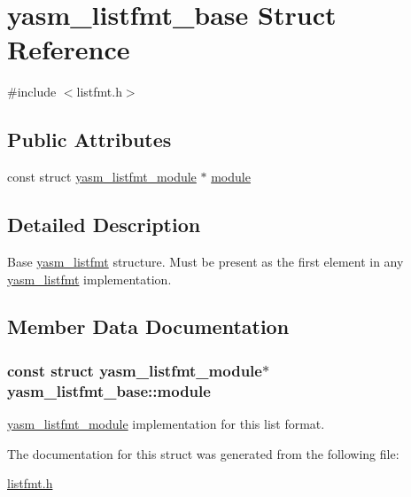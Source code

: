 \hypertarget{structyasm__listfmt__base}{\section{yasm\-\_\-listfmt\-\_\-base Struct Reference}
\label{structyasm__listfmt__base}
}


{\ttfamily \#include $<$listfmt.\-h$>$}

\subsection*{Public Attributes}
\begin{DoxyCompactItemize}
\item 
const struct \hyperlink{structyasm__listfmt__module}{yasm\-\_\-listfmt\-\_\-module} $\ast$ \hyperlink{structyasm__listfmt__base_a2e8517506502a66700149afe50a3c15d}{module}
\end{DoxyCompactItemize}


\subsection{Detailed Description}
Base \hyperlink{coretype_8h_ae7dd230a0e386f070ca54f9d270eae26}{yasm\-\_\-listfmt} structure. Must be present as the first element in any \hyperlink{coretype_8h_ae7dd230a0e386f070ca54f9d270eae26}{yasm\-\_\-listfmt} implementation. 

\subsection{Member Data Documentation}
\hypertarget{structyasm__listfmt__base_a2e8517506502a66700149afe50a3c15d}{
\subsubsection[{module}]{\setlength{\rightskip}{0pt plus 5cm}const struct {\bf yasm\-\_\-listfmt\-\_\-module}$\ast$ yasm\-\_\-listfmt\-\_\-base\-::module}}\label{structyasm__listfmt__base_a2e8517506502a66700149afe50a3c15d}
\hyperlink{structyasm__listfmt__module}{yasm\-\_\-listfmt\-\_\-module} implementation for this list format. 

The documentation for this struct was generated from the following file\-:\begin{DoxyCompactItemize}
\item 
\hyperlink{listfmt_8h}{listfmt.\-h}\end{DoxyCompactItemize}
